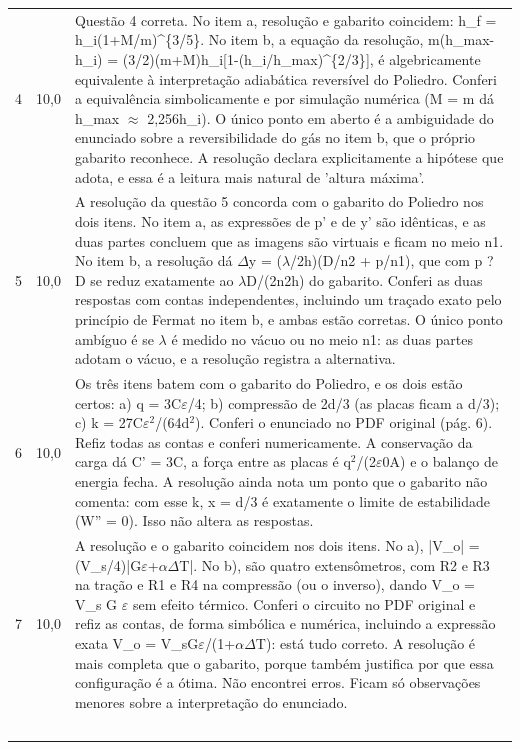 \documentclass{article}%
\begin{document}
\begin{longtable}{@{}c c p{}@{}}
4 & 10,0 & Questão 4 correta. No item a, resolução e gabarito coincidem: h\_f = h\_i(1+M/m)\^{}\{3/5\}. No item b, a equação da resolução, m(h\_max-h\_i) = (3/2)(m+M)h\_i{[}1-(h\_i/h\_max)\^{}\{2/3\}{]}, é algebricamente equivalente à interpretação adiabática reversível do Poliedro. Conferi a equivalência simbolicamente e por simulação numérica (M = m dá h\_max $\approx$ 2,256h\_i). O único ponto em aberto é a ambiguidade do enunciado sobre a reversibilidade do gás no item b, que o próprio gabarito reconhece. A resolução declara explicitamente a hipótese que adota, e essa é a leitura mais natural de 'altura máxima'. \\
5 & 10,0 & A resolução da questão 5 concorda com o gabarito do Poliedro nos dois itens. No item a, as expressões de p' e de y' são idênticas, e as duas partes concluem que as imagens são virtuais e ficam no meio n1. No item b, a resolução dá $\Delta$y = ($\lambda$/2h)(D/n2 + p/n1), que com p ? D se reduz exatamente ao $\lambda$D/(2n2h) do gabarito. Conferi as duas respostas com contas independentes, incluindo um traçado exato pelo princípio de Fermat no item b, e ambas estão corretas. O único ponto ambíguo é se $\lambda$ é medido no vácuo ou no meio n1: as duas partes adotam o vácuo, e a resolução registra a alternativa. \\
6 & 10,0 & Os três itens batem com o gabarito do Poliedro, e os dois estão certos: a) q = 3C$\varepsilon$/4; b) compressão de 2d/3 (as placas ficam a d/3); c) k = 27C$\varepsilon$$^2$/(64d$^2$). Conferi o enunciado no PDF original (pág. 6). Refiz todas as contas e conferi numericamente. A conservação da carga dá C' = 3C, a força entre as placas é q$^2$/(2$\varepsilon$0A) e o balanço de energia fecha. A resolução ainda nota um ponto que o gabarito não comenta: com esse k, x = d/3 é exatamente o limite de estabilidade (W'' = 0). Isso não altera as respostas. \\
7 & 10,0 & A resolução e o gabarito coincidem nos dois itens. No a), |V\_o| = (V\_s/4)|G$\varepsilon$+$\alpha$$\Delta$T|. No b), são quatro extensômetros, com R2 e R3 na tração e R1 e R4 na compressão (ou o inverso), dando V\_o = V\_s G $\varepsilon$ sem efeito térmico. Conferi o circuito no PDF original e refiz as contas, de forma simbólica e numérica, incluindo a expressão exata V\_o = V\_sG$\varepsilon$/(1+$\alpha$$\Delta$T): está tudo correto. A resolução é mais completa que o gabarito, porque também justifica por que essa configuração é a ótima. Não encontrei erros. Ficam só observações menores sobre a interpretação do enunciado. \\
$$
\end{longtable}
\end{document}
